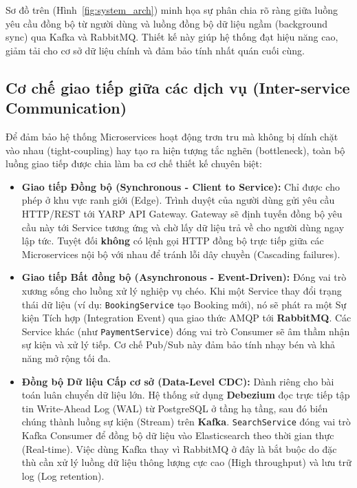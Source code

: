 Sơ đồ trên (Hình~\ref{fig:system_arch}) minh họa sự phân chia rõ ràng giữa luồng yêu cầu đồng bộ từ người dùng và luồng đồng bộ dữ liệu ngầm (background sync) qua Kafka và RabbitMQ. Thiết kế này giúp hệ thống đạt hiệu năng cao, giảm tải cho cơ sở dữ liệu chính và đảm bảo tính nhất quán cuối cùng.

\subsection{Cơ chế giao tiếp giữa các dịch vụ (Inter-service Communication)}
\label{subsec:communication}

Để đảm bảo hệ thống Microservices hoạt động trơn tru mà không bị dính chặt vào nhau (tight-coupling) hay tạo ra hiện tượng tắc nghẽn (bottleneck), toàn bộ luồng giao tiếp được chia làm ba cơ chế thiết kế chuyên biệt:

\begin{itemize}
  \item \textbf{Giao tiếp Đồng bộ (Synchronous - Client to Service):} Chỉ được cho phép ở khu vực ranh giới (Edge). Trình duyệt của người dùng gửi yêu cầu HTTP/REST tới YARP API Gateway. Gateway sẽ định tuyến đồng bộ yêu cầu này tới Service tương ứng và chờ lấy dữ liệu trả về cho người dùng ngay lập tức. Tuyệt đối \textbf{không} có lệnh gọi HTTP đồng bộ trực tiếp giữa các Microservices nội bộ với nhau để tránh lỗi dây chuyền (Cascading failures).

  \item \textbf{Giao tiếp Bất đồng bộ (Asynchronous - Event-Driven):} Đóng vai trò xương sống cho luồng xử lý nghiệp vụ chéo. Khi một Service thay đổi trạng thái dữ liệu (ví dụ: \texttt{BookingService} tạo Booking mới), nó sẽ phát ra một Sự kiện Tích hợp (Integration Event) qua giao thức AMQP tới \textbf{RabbitMQ}. Các Service khác (như \texttt{PaymentService}) đóng vai trò Consumer sẽ âm thầm nhận sự kiện và xử lý tiếp. Cơ chế Pub/Sub này đảm bảo tính nhạy bén và khả năng mở rộng tối đa.

  \item \textbf{Đồng bộ Dữ liệu Cấp cơ sở (Data-Level CDC):} Dành riêng cho bài toán luân chuyển dữ liệu lớn. Hệ thống sử dụng \textbf{Debezium} đọc trực tiếp tập tin Write-Ahead Log (WAL) từ PostgreSQL ở tầng hạ tầng, sau đó biến chúng thành luồng sự kiện (Stream) trên \textbf{Kafka}. \texttt{SearchService} đóng vai trò Kafka Consumer để đồng bộ dữ liệu vào Elasticsearch theo thời gian thực (Real-time). Việc dùng Kafka thay vì RabbitMQ ở đây là bắt buộc do đặc thù cần xử lý luồng dữ liệu thông lượng cực cao (High throughput) và lưu trữ log (Log retention).
\end{itemize}

